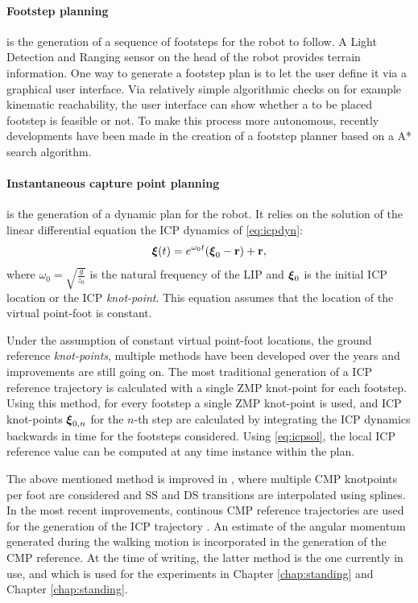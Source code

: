 \paragraph{Footstep planning} is the generation of a sequence of footsteps for the robot to follow. A Light Detection and Ranging sensor on the head of the robot provides terrain information. One way to generate a footstep plan is to let the user define it via a graphical user interface. Via relatively simple algorithmic checks on for example kinematic reachability, the user interface can show whether a to be placed footstep is feasible or not. To make this process more autonomous, recently developments have been made in the creation of a footstep planner based on a A* search algorithm. 
\paragraph{Instantaneous capture point planning}\label{subsec:icpplan} is the generation of a dynamic plan for the robot. It relies on the solution of the linear differential equation the \ac{ICP} dynamics of \eqref{eq:icpdyn}:
\begin{equation}\label{eq:icpsol}
	\boldsymbol{\xi}(t)=e^{\omega_0t}(\boldsymbol{\xi}_0- \mathbf{r}) + \mathbf{r},
\end{equation}
where $\omega_0=\sqrt{\frac{g}{z_0}}$ is the natural frequency of the \ac{LIP} and $\boldsymbol{\xi}_0$ is the initial \ac{ICP} location or the \ac{ICP} \textit{knot-point}. This equation assumes that the location of the virtual point-foot is constant. 

Under the assumption of constant virtual point-foot locations, the ground reference \textit{knot-points}, multiple methods have been developed over the years and improvements are still going on. The most traditional generation of a \ac{ICP} reference trajectory is calculated with a single \ac{ZMP} knot-point \cite{englsberger2012integration} for each footstep. Using this method, for every footstep a single \ac{ZMP} knot-point is used, and \ac{ICP} knot-points $\boldsymbol{\xi}_{0,n}$ for the $n$-th step are calculated by integrating the \ac{ICP} dynamics backwards in time for the footsteps considered. Using \eqref{eq:icpsol}, the local \ac{ICP} reference value can be computed at any time instance within the plan. 

The above mentioned method is improved in \cite{englsberger2014trajectory}, where multiple \ac{CMP} knotpoints per foot are considered and \ac{SS} and \ac{DS} transitions are interpolated using splines. In the most recent improvements, continous \ac{CMP} reference trajectories are used for the generation of the \ac{ICP} trajectory \cite{seyde2018inclusion}. An estimate of the angular momentum generated during the walking motion is incorporated in the generation of the \ac{CMP} reference. At the time of writing, the latter method is the one currently in use, and which is used for the experiments in Chapter \ref{chap:standing} and Chapter \ref{chap:standing}.
